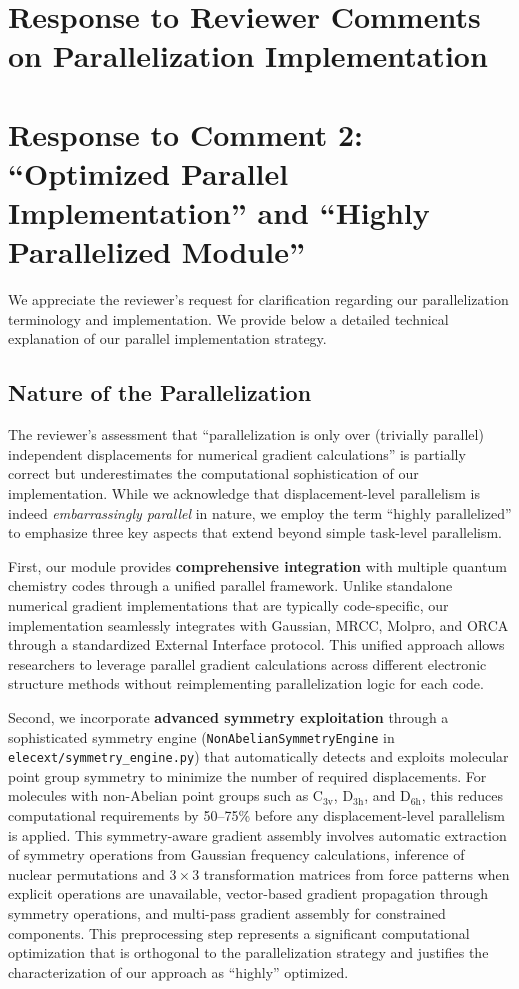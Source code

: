 \documentclass[11pt]{article}
\begin{document}
\section*{Response to Reviewer Comments on Parallelization Implementation}

\section{Response to Comment 2: ``Optimized Parallel Implementation'' and ``Highly Parallelized Module''}

We appreciate the reviewer's request for clarification regarding our parallelization terminology and implementation. We provide below a detailed technical explanation of our parallel implementation strategy.

\subsection{Nature of the Parallelization}

The reviewer's assessment that ``parallelization is only over (trivially parallel) independent displacements for numerical gradient calculations'' is partially correct but underestimates the computational sophistication of our implementation. While we acknowledge that displacement-level parallelism is indeed \textit{embarrassingly parallel} in nature, we employ the term ``highly parallelized'' to emphasize three key aspects that extend beyond simple task-level parallelism.

First, our module provides \textbf{comprehensive integration} with multiple quantum chemistry codes through a unified parallel framework. Unlike standalone numerical gradient implementations that are typically code-specific, our implementation seamlessly integrates with Gaussian, MRCC, Molpro, and ORCA through a standardized External Interface protocol. This unified approach allows researchers to leverage parallel gradient calculations across different electronic structure methods without reimplementing parallelization logic for each code.

Second, we incorporate \textbf{advanced symmetry exploitation} through a sophisticated symmetry engine (\texttt{NonAbelianSymmetryEngine} in \texttt{elecext/symmetry\_engine.py}) that automatically detects and exploits molecular point group symmetry to minimize the number of required displacements. For molecules with non-Abelian point groups such as C$_{\text{3v}}$, D$_{\text{3h}}$, and D$_{\text{6h}}$, this reduces computational requirements by 50--75\% before any displacement-level parallelism is applied. This symmetry-aware gradient assembly involves automatic extraction of symmetry operations from Gaussian frequency calculations, inference of nuclear permutations and $3 \times 3$ transformation matrices from force patterns when explicit operations are unavailable, vector-based gradient propagation through symmetry operations, and multi-pass gradient assembly for constrained components. This preprocessing step represents a significant computational optimization that is orthogonal to the parallelization strategy and justifies the characterization of our approach as ``highly'' optimized.
\end{document}
